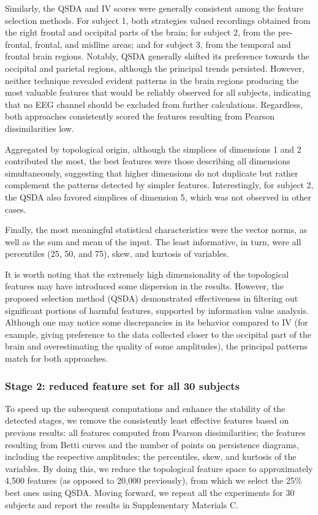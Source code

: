 \documentclass[journal,twoside,web]{ieeecolor2}
\begin{document}
Similarly, the QSDA and IV scores were generally consistent among the feature selection methods. For subject 1, both strategies valued recordings obtained from the right frontal and occipital parts of the brain; for subject 2, from the pre-frontal, frontal, and midline areas; and for subject 3, from the temporal and frontal brain regions. Notably, QSDA generally shifted its preference towards the occipital and parietal regions, although the principal trends persisted. However, neither technique revealed evident patterns in the brain regions producing the most valuable features that would be reliably observed for all subjects, indicating that no EEG channel should be excluded from further calculations. Regardless, both approaches consistently scored the features resulting from Pearson dissimilarities low.

Aggregated by topological origin, although the simplices of dimensions 1 and 2 contributed the most, the best features were those describing all dimensions simultaneously, suggesting that higher dimensions do not duplicate but rather complement the patterns detected by simpler features. Interestingly, for subject 2, the QSDA also favored simplices of dimension 5, which was not observed in other cases.

Finally, the most meaningful statistical characteristics were the vector norms, as well as the sum and mean of the input. The least informative, in turn, were all percentiles (25, 50, and 75), skew, and kurtosis of variables.

It is worth noting that the extremely high dimensionality of the topological features may have introduced some dispersion in the results. However, the proposed selection method (QSDA) demonstrated effectiveness in filtering out significant portions of harmful features, supported by information value analysis. Although one may notice some discrepancies in its behavior compared to IV (for example, giving preference to the data collected closer to the occipital part of the brain and overestimating the quality of some amplitudes), the principal patterns match for both approaches.

\subsubsection{Stage 2: reduced feature set for all 30 subjects}

To speed up the subsequent computations and enhance the stability of the detected stages, we remove the consistently least effective features based on previous results: all features computed from Pearson dissimilarities; the features resulting from Betti curves and the number of points on persistence diagrams, including the respective amplitudes; the percentiles, skew, and kurtosis of the variables. By doing this, we reduce the topological feature space to approximately 4,500 features (as opposed to 20,000 previously), from which we select the 25\% best ones using QSDA. Moving forward, we repeat all the experiments for 30 subjects and report the results in Supplementary Materials C.
\end{document}

